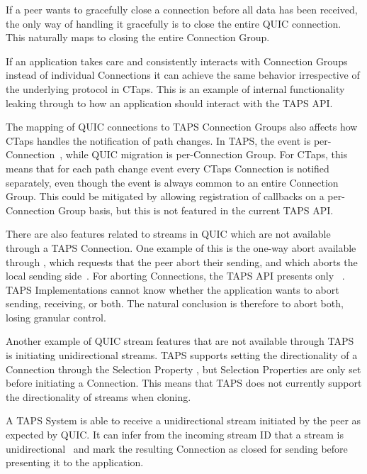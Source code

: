 If a peer wants to gracefully close
a connection before all data has been received, the only way of handling it gracefully is to
close the entire QUIC connection. This naturally maps to closing the entire Connection Group. 

If an application takes care and consistently interacts
with Connection Groups instead of individual Connections it can achieve the same
behavior irrespective of the underlying protocol in CTaps.
This is an example of internal functionality leaking through to
how an application should interact with the TAPS API.

The mapping of QUIC connections to TAPS Connection Groups also affects how
CTaps handles the notification of path changes. In TAPS, the  
event is per-Connection~\cite[sec. 8.3.2]{rfc9622},
while QUIC migration is per-Connection Group.
For CTaps, this means that for each path change event every CTaps Connection is notified
separately, even though the event is always common to an
entire Connection Group. This could be mitigated by allowing registration
of callbacks on a per-Connection Group basis, but this is not featured
in the current TAPS API.

There are also features related to streams in QUIC which are not available
through a TAPS Connection.
One example of this is the one-way abort
available through , which requests that the peer abort their
sending, and 
which aborts the local sending side~\cite[sec. 19.4--19.5]{rfc9000}.
For aborting Connections, the TAPS API presents only
~\cite[sec. 10]{rfc9622}.
TAPS Implementations cannot know whether the application
wants to abort sending, receiving, or both. The natural conclusion is
therefore to abort both, losing granular control.

Another example of QUIC stream features that are not available through
TAPS is initiating unidirectional streams. TAPS
supports setting the directionality of a Connection through the
 Selection Property \cite[sec.~6.2.16]{rfc9622},
but Selection Properties are only set before initiating a Connection.
This means that TAPS does not currently support
the directionality of streams when cloning.

A TAPS System is able to receive a unidirectional stream initiated by the peer as expected by QUIC.
It can infer from the incoming stream ID that a stream is unidirectional~\cite[sec. 2.1]{rfc9000}
and mark the resulting Connection as closed for sending before presenting it to the application.


